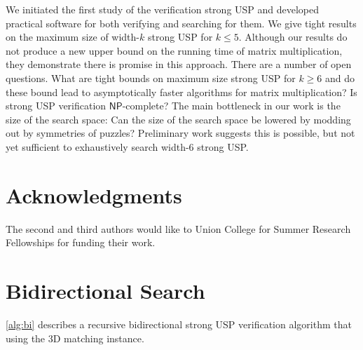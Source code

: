 \documentclass[11pt]{article}
\renewcommand\NP{\ensuremath{\mathsf{NP}}}
\begin{document}
We initiated the first study of the verification strong USP and
developed practical software for both verifying and searching for
them.  We give tight results on the maximum size of width-$k$
strong USP for $k \le 5$.  Although our results do not produce a new
upper bound on the running time of matrix multiplication, they
demonstrate there is promise in this approach. %
There are a number of open questions.
What are tight bounds on maximum size
strong USP for $k \ge 6$ and do these bound lead to asymptotically
faster algorithms for matrix multiplication?
Is strong USP verification \NP-complete?
The main bottleneck in
our work is the size of the search space:
Can the size of the search space be lowered by modding out by symmetries of puzzles?  Preliminary work
suggests this is possible, but not yet sufficient to exhaustively
search width-6 strong USP.

\section{Acknowledgments}

The second and third authors would like to Union College for 
Summer Research Fellowships for funding their work.

 

\appendix

\section{Bidirectional Search}

\label{app:bi}

\autoref{alg:bi} describes a recursive
bidirectional strong USP verification algorithm that using the 3D
matching instance.
\end{document}
